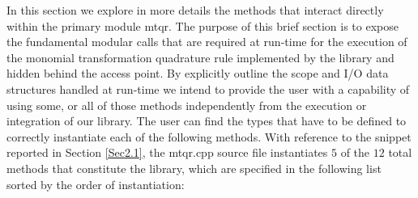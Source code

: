 \documentclass[a4paper, twosided]{book}
\begin{document}
\noindent
In this section we explore in more details the methods that interact directly within the primary module \colorbox{poliGrayBlue}{mtqr}. The purpose of this brief section is to expose the fundamental modular calls that are required at run-time for the execution of the monomial transformation quadrature rule implemented by the library and hidden behind the access point. By explicitly outline the scope and I/O data structures handled at run-time we intend to provide the user with a capability of using some, or all of those methods independently from the execution or integration of our library. The user can find the types that have to be defined to correctly instantiate each of the following methods. With reference to the snippet reported in Section \ref{Sec2.1}, the \colorbox{poliGrayBlue}{mtqr.cpp} source file instantiates $5$ of the $12$ total methods that constitute the library, which are specified in the following list sorted by the order of instantiation:
\end{document}
